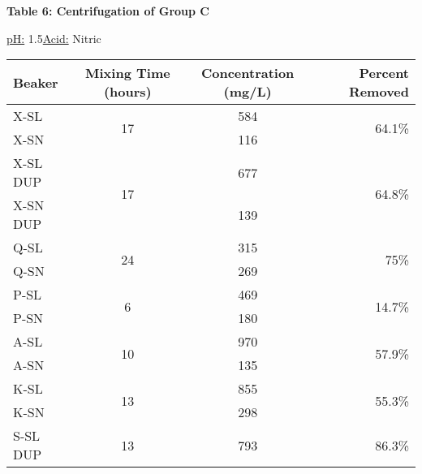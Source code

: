\begin{center}
\begin{minipage}{.5\textwidth}
        \end{minipage}
        \newpage
        \renewcommand\arraystretch{1.5}
        {\large{\bf Table 6: Centrifugation of Group C\\}}
        \vspace{2 mm}
        \underline{pH:} 1.5\hspace{5mm}\underline{Acid:} Nitric\\
        \vspace{2 mm}
        \begin{tabular}{|l c c r|}
            \hline
            \textbf{Beaker} & \textbf{Mixing Time (hours)} & \textbf{Concentration (mg/L)} & \textbf{Percent Removed} \\ \hline
            X-SL     & \multirow{2}{*}{17} & 584  & \multirow{2}{*}{64.1\%} \\
            X-SN     & & 116  & \\\hline
            X-SL DUP & \multirow{2}{*}{17} & 677  & \multirow{2}{*}{64.8\%} \\
            X-SN DUP & & 139  & \\\hline
            Q-SL     & \multirow{2}{*}{24} & 315  & \multirow{2}{*}{75\%}   \\
            Q-SN     & & 269  &   \\\hline
            P-SL     & \multirow{2}{*}{6}  & 469  & \multirow{2}{*}{14.7\%} \\
            P-SN     & & 180  & \\\hline
            A-SL     & \multirow{2}{*}{10} & 970  & \multirow{2}{*}{57.9\%} \\
            A-SN     & & 135  & \\\hline
            K-SL     & \multirow{2}{*}{13} & 855  & \multirow{2}{*}{55.3\%} \\
            K-SN     & & 298  & \\\hline
            S-SL DUP & \multirow{2}{*}{13} & 793  & \multirow{2}{*}{86.3\%} \\

\end{tabular}
\end{center}
